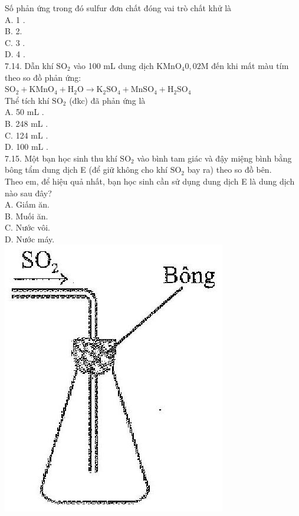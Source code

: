 \documentclass[10pt]{article}
\begin{document}
Số phản ứng trong đó sulfur đơn chất đóng vai trò chất khử là\\
A. 1 .\\
B. 2.\\
C. 3 .\\
D. 4 .\\
7.14. Dẫn khí $\mathrm{SO}_{2}$ vào 100 mL dung dịch $\mathrm{KMnO}_{4} 0,02 \mathrm{M}$ đến khi mất màu tím theo so đồ phản ứng:\\
$\mathrm{SO}_{2}+\mathrm{KMnO}_{4}+\mathrm{H}_{2} \mathrm{O} \longrightarrow \mathrm{K}_{2} \mathrm{SO}_{4}+\mathrm{MnSO}_{4}+\mathrm{H}_{2} \mathrm{SO}_{4}$\\
Thể tích khí $\mathrm{SO}_{2}$ (đkc) đã phản ứng là\\
A. 50 mL .\\
B. 248 mL .\\
C. 124 mL .\\
D. 100 mL .\\
7.15. Một bạn học sinh thu khí $\mathrm{SO}_{2}$ vào bình tam giác và đậy miệng bình bằng bông tẩm dung dịch E (để giữ không cho khí $\mathrm{SO}_{2}$ bay ra) theo so đồ bên.\\
Theo em, để hiệu quả nhất, bạn học sinh cần sử dụng dung dịch E là dung dịch nào sau đây?\\
A. Giấm ăn.\\
B. Muối ăn.\\
C. Nước vôi.\\
D. Nước máy.\\
\includegraphics[max width=\textwidth, center]{2025_10_23_fa9073eecee116ad8cf2g-24}\\
\end{document}
